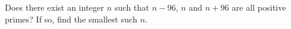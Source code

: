 Does there exist an integer $n$ such that $n-96$, $n$ and $n+96$ are all positive primes? If so, find the smallest such $n$.
